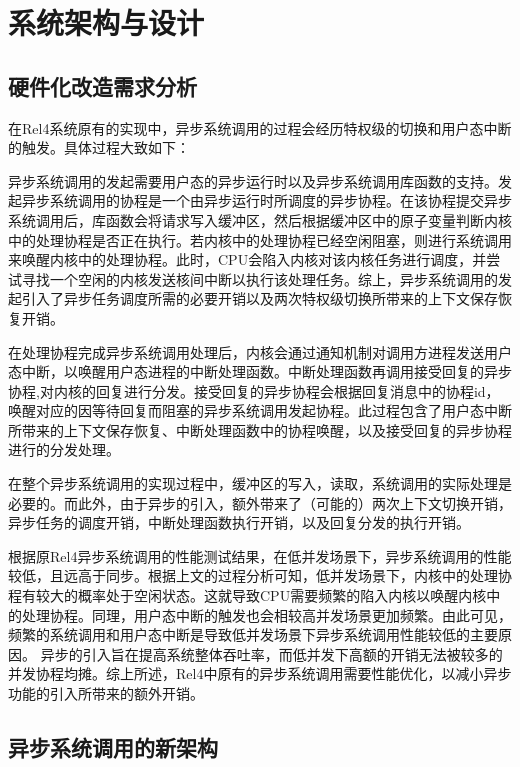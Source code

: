 \chapter{系统架构与设计}

\section{硬件化改造需求分析}

在Rel4系统原有的实现中，异步系统调用的过程会经历特权级的切换和用户态中断的触发。具体过程大致如下：

异步系统调用的发起需要用户态的异步运行时以及异步系统调用库函数的支持。发起异步系统调用的协程是一个由异步运行时所调度的异步协程。在该协程提交异步系统调用后，库函数会将请求写入缓冲区，然后根据缓冲区中的原子变量判断内核中的处理协程是否正在执行。若内核中的处理协程已经空闲阻塞，则进行系统调用来唤醒内核中的处理协程。此时，CPU会陷入内核对该内核任务进行调度，并尝试寻找一个空闲的内核发送核间中断以执行该处理任务。综上，异步系统调用的发起引入了异步任务调度所需的必要开销以及两次特权级切换所带来的上下文保存恢复开销。

在处理协程完成异步系统调用处理后，内核会通过通知机制对调用方进程发送用户态中断，以唤醒用户态进程的中断处理函数。中断处理函数再调用接受回复的异步协程,对内核的回复进行分发。接受回复的异步协程会根据回复消息中的协程id，唤醒对应的因等待回复而阻塞的异步系统调用发起协程。此过程包含了用户态中断所带来的上下文保存恢复、中断处理函数中的协程唤醒，以及接受回复的异步协程进行的分发处理。

在整个异步系统调用的实现过程中，缓冲区的写入，读取，系统调用的实际处理是必要的。而此外，由于异步的引入，额外带来了（可能的）两次上下文切换开销，异步任务的调度开销，中断处理函数执行开销，以及回复分发的执行开销。

根据原Rel4异步系统调用的性能测试结果，在低并发场景下，异步系统调用的性能较低，且远高于同步。根据上文的过程分析可知，低并发场景下，内核中的处理协程有较大的概率处于空闲状态。这就导致CPU需要频繁的陷入内核以唤醒内核中的处理协程。同理，用户态中断的触发也会相较高并发场景更加频繁。由此可见，频繁的系统调用和用户态中断是导致低并发场景下异步系统调用性能较低的主要原因。
异步的引入旨在提高系统整体吞吐率，而低并发下高额的开销无法被较多的并发协程均摊。综上所述，Rel4中原有的异步系统调用需要性能优化，以减小异步功能的引入所带来的额外开销。

\section{异步系统调用的新架构}


